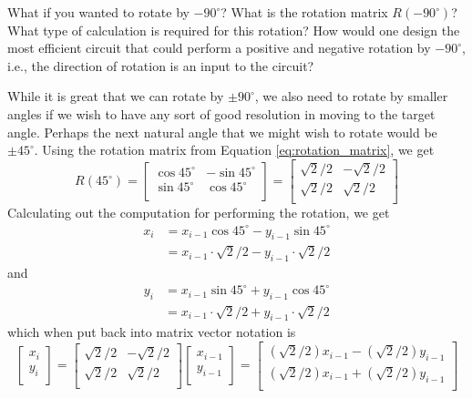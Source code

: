 \begin{exercise}
What if you wanted to rotate by $-90^\circ$? What is the rotation matrix $R(-90^\circ)$? What type of calculation is required for this rotation? How would one design the most efficient circuit that could perform a positive and negative rotation by $-90^\circ$, i.e., the direction of rotation is an input to the circuit?
\end{exercise}

While it is great that we can rotate by $\pm 90^\circ$, we also need to rotate by smaller angles if we wish to have any sort of good resolution in moving to the target angle. Perhaps the next natural angle that we might wish to rotate would be $\pm 45^\circ$. Using the rotation matrix from Equation \ref{eq:rotation_matrix}, we get
\begin{equation}
R(45^\circ) = \begin{bmatrix}
\cos 45^\circ & -\sin 45^\circ \\
\sin 45^\circ & \cos 45^\circ \\
\end{bmatrix} = \begin{bmatrix}
\sqrt 2/2 & -\sqrt 2/2 \\
\sqrt 2/2 & \sqrt 2/2 \\
\end{bmatrix}
\end{equation} Calculating out the computation for performing the rotation, we get
\begin{align}
x_i &= x_{i-1}  \cos 45^\circ - y_{i-1} \sin 45^\circ \nonumber \\
& = x_{i-1} \cdot \sqrt 2/2  - y_{i-1} \cdot \sqrt 2/2
\end{align} and 
\begin{align}
y_i &= x_{i-1} \sin  45^\circ + y_{i-1} \cos 45^\circ \nonumber \\
&= x_{i-1} \cdot \sqrt 2/2 + y_{i-1} \cdot \sqrt 2/2
\end{align} which when put back into matrix vector notation is
\begin{equation}
    \begin{bmatrix}
x_i \\
y_i \\
\end{bmatrix} 
=
\begin{bmatrix}
\sqrt 2/2 & -\sqrt 2/2 \\
\sqrt 2/2 & \sqrt 2/2 \\
\end{bmatrix}
\begin{bmatrix}
x_{i-1} \\
y_{i-1} \\
\end{bmatrix}
= \begin{bmatrix}
(\sqrt 2/2) x_{i-1} - (\sqrt 2/2) y_{i-1} \\
(\sqrt 2/2) x_{i-1} + (\sqrt 2/2) y_{i-1} \\
\end{bmatrix} 
\end{equation}
